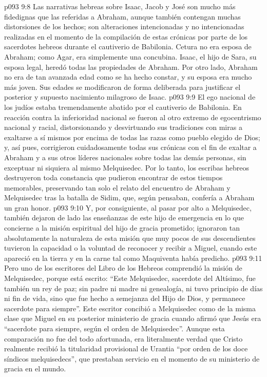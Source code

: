 \vs p093 9:8 Las narrativas hebreas sobre Isaac, Jacob y José son mucho más fidedignas que las referidas a Abraham, aunque también contengan muchas distorsiones de los hechos; son alteraciones intencionadas y no intencionadas realizadas en el momento de la compilación de estas crónicas por parte de los sacerdotes hebreos durante el cautiverio de Babilonia. Cetura no era esposa de Abraham; como Agar, era simplemente una concubina. Isaac, el hijo de Sara, su esposa legal, heredó todas las propiedades de Abraham. Por otro lado, Abraham no era de tan avanzada edad como se ha hecho constar, y su esposa era mucho más joven. Sus edades se modificaron de forma deliberada para justificar el posterior y supuesto nacimiento milagroso de Isaac.
\vs p093 9:9 \pc El ego nacional de los judíos estaba tremendamente abatido por el cautiverio de Babilonia. En reacción contra la inferioridad nacional se fueron al otro extremo de egocentrismo nacional y racial, distorsionando y desvirtuando sus tradiciones con miras a exaltarse a sí mismos por encima de todas las razas como pueblo elegido de Dios; y, así pues, corrigieron cuidadosamente todas sus crónicas con el fin de exaltar a Abraham y a sus otros líderes nacionales sobre todas las demás personas, sin exceptuar ni siquiera al mismo Melquisedec. Por lo tanto, los escribas hebreos destruyeron toda constancia que pudieron encontrar de estos tiempos memorables, preservando tan solo el relato del encuentro de Abraham y Melquisedec tras la batalla de Sidim, que, según pensaban, confería a Abraham un gran honor.
\vs p093 9:10 Y, por consiguiente, al pasar por alto a Melquisedec, también dejaron de lado las enseñanzas de este hijo de emergencia en lo que concierne a la misión espiritual del hijo de gracia prometido; ignoraron tan absolutamente la naturaleza de esta misión que muy pocos de sus descendientes tuvieron la capacidad o la voluntad de reconocer y recibir a Miguel, cuando este apareció en la tierra y en la carne tal como Maquiventa había predicho.
\vs p093 9:11 Pero uno de los escritores del Libro de los Hebreos comprendió la misión de Melquisedec, porque está escrito: “Este Melquisedec, sacerdote del Altísimo, fue también un rey de paz; sin padre ni madre ni genealogía, ni tuvo principio de días ni fin de vida, sino que fue hecho a semejanza del Hijo de Dios, y permanece sacerdote para siempre”. Este escritor concibió a Melquisedec como de la misma clase que Miguel en su posterior ministerio de gracia cuando afirmó que Jesús era “sacerdote para siempre, según el orden de Melquisedec”. Aunque esta comparación no fue del todo afortunada, era literalmente verdad que Cristo realmente recibió la titularidad provisional de Urantia “por orden de los doce síndicos melquisedecs”, que prestaban servicio en el momento de su ministerio de gracia en el mundo.
